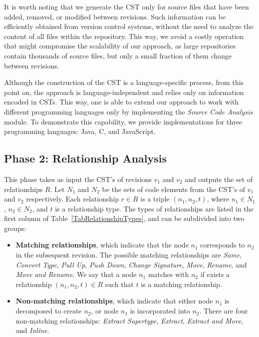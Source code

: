 It is worth noting that we generate the CST only for source files that have been added, removed, or modified between revisions. 
Such information can be efficiently obtained from version control systems, without the need to analyze the content of all files within the repository.
This way, we avoid a costly operation that might compromise the scalability of our approach, as large repositories contain thousands of source files, but only a small fraction of them change between revisions.

Although the construction of the CST is a language-specific process, from this point on, the approach is language-independent and relies only on information encoded in CSTs.
This way, one is able to extend our approach to work with different programming languages only by implementing the \emph{Source Code Analysis} module.
To demonstrate this capability, we provide implementations for three programming languages: Java, C, and JavaScript.


\subsection{Phase 2: Relationship Analysis}

This phase takes as input the CST's of revisions $v_1$ and $v_2$ and outputs the set of relationships $R$. Let $N_1$ and $N_2$ be the sets of code elements from the CST's of $v_1$ and $v_2$ respectively. Each relationship $r \in R$ is a triple $(n_1, n_2, t)$, where $n_1 \in N_1$, $n_2 \in N_2$, and $t$ is a relationship type. The types of relationships are listed in the first column of Table~\ref{TabRelationshipTypes}, and can be subdivided into two groups:
\begin{itemize}
\item \textbf{Matching relationships}, which indicate that the node $n_1$ corresponds to $n_2$ in the subsequent revision.
The possible matching relationships are \textit{Same}, \textit{Convert Type}, \textit{Pull Up}, \textit{Push Down}, \textit{Change Signature}, \textit{Move}, \textit{Rename}, and \textit{Move and Rename}.
We say that a node $n_1$ matches with $n_2$ if exists a relationship $(n_1, n_2, t) \in R$ such that $t$ is a matching relationship.

\item \textbf{Non-matching relationships}, which indicate that either node $n_1$ is decomposed to create $n_2$, or node $n_1$ is incorporated into $n_2$.
There are four non-matching relationships: \textit{Extract Supertype}, \textit{Extract}, \textit{Extract and Move}, and \textit{Inline}.
\end{itemize}


